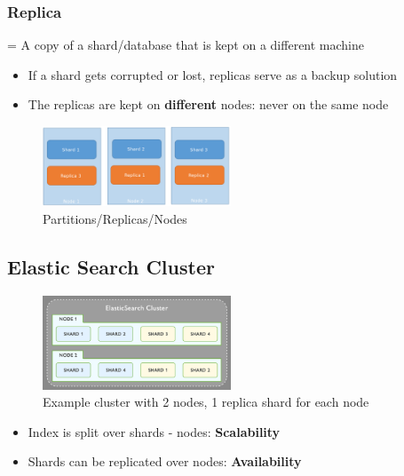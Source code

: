 \documentclass{article}
\begin{document}
\subsubsection{Replica}

= A copy of a shard/database that is kept on a different machine

\begin{itemize}
    \item If a shard gets corrupted or lost, replicas serve as a backup solution
    \item The replicas are kept on \textbf{different} nodes: never on the same node
\end{itemize}

\begin{figure}[H]
    \centering
    \includegraphics[width=0.5\textwidth]{partitions-replicas-nodes.png}
    \caption{Partitions/Replicas/Nodes}
\end{figure}

\subsection{Elastic Search Cluster}

\begin{figure}[H]
    \centering
    \includegraphics[width=0.5\textwidth]{elasticsearch-cluster.png}
    \caption{Example cluster with 2 nodes, 1 replica shard for each node}
\end{figure}

\begin{itemize}
    \item Index is split over shards - nodes: \textbf{Scalability}
    \item Shards can be replicated over nodes: \textbf{Availability}
\end{itemize}
\end{document}
